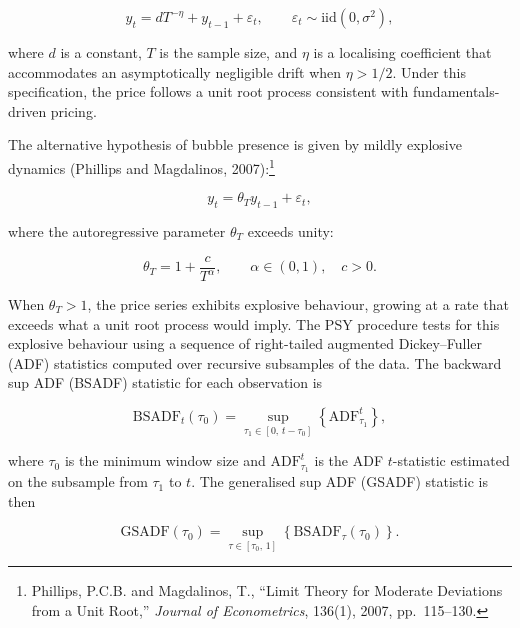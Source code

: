 \documentclass[12pt,a4paper]{article}
\begin{document}
\begin{equation}
y_t = dT^{-\eta} + y_{t-1} + \varepsilon_t, \qquad \varepsilon_t \sim \text{iid}(0, \sigma^2),
\end{equation}

\noindent where $d$ is a constant, $T$ is the sample size, and $\eta$ is a localising coefficient that accommodates an asymptotically negligible drift when $\eta > 1/2$. Under this specification, the price follows a unit root process consistent with fundamentals-driven pricing.

The alternative hypothesis of bubble presence is given by mildly explosive dynamics (Phillips and Magdalinos, 2007):\footnote{Phillips, P.C.B. and Magdalinos, T., ``Limit Theory for Moderate Deviations from a Unit Root,'' \textit{Journal of Econometrics}, 136(1), 2007, pp.\ 115--130.}

\begin{equation}
y_t = \theta_T y_{t-1} + \varepsilon_t,
\end{equation}

\noindent where the autoregressive parameter $\theta_T$ exceeds unity:

\begin{equation}
\theta_T = 1 + \frac{c}{T^{\alpha}}, \qquad \alpha \in (0,1), \quad c > 0.
\end{equation}

\noindent When $\theta_T > 1$, the price series exhibits explosive behaviour, growing at a rate that exceeds what a unit root process would imply. The PSY procedure tests for this explosive behaviour using a sequence of right-tailed augmented Dickey--Fuller (ADF) statistics computed over recursive subsamples of the data. The backward sup ADF (BSADF) statistic for each observation is

\begin{equation}
\text{BSADF}_t(\tau_0) = \sup_{\tau_1 \in [0, \, t - \tau_0]} \left\{ \text{ADF}_{\tau_1}^{t} \right\},
\end{equation}

\noindent where $\tau_0$ is the minimum window size and $\text{ADF}_{\tau_1}^{t}$ is the ADF $t$-statistic estimated on the subsample from $\tau_1$ to $t$. The generalised sup ADF (GSADF) statistic is then

\begin{equation}
\text{GSADF}(\tau_0) = \sup_{\tau \in [\tau_0, \, 1]} \left\{ \text{BSADF}_\tau(\tau_0) \right\}.
\end{equation}
\end{document}
